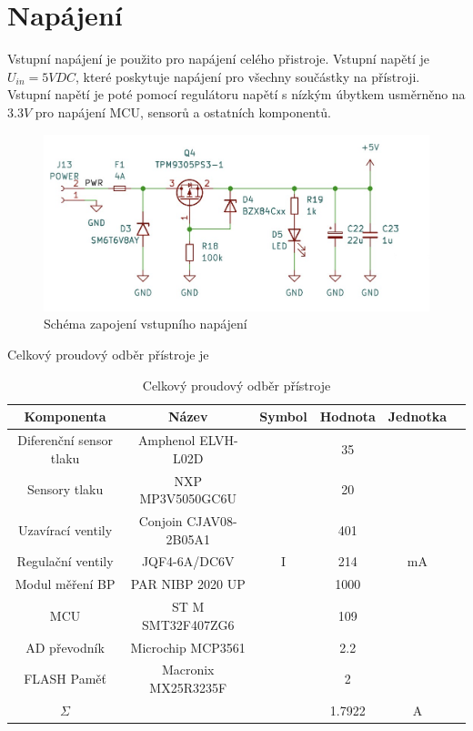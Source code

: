 \section{Napájení}
Vstupní napájení je použito pro napájení celého přistroje. Vstupní napětí je $U_{in} = 5V DC$, které poskytuje napájení pro všechny součástky na přístroji. Vstupní napětí je poté pomocí regulátoru napětí s nízkým úbytkem usměrněno na $3.3 V$ pro napájení MCU, sensorů a ostatních komponentů.

\begin{figure}[H]
    \includegraphics[width=0.9\linewidth]{pictures/power.jpg}
    \caption{Schéma zapojení vstupního napájení}
    \label{fig:power_input}
\end{figure}

Celkový proudový odběr přístroje je
\begin{table}[H]
    \label{tab:sum_of_current}
    \caption{Celkový proudový odběr přístroje}
    \hspace*{-1.2cm}
    \begin{ctucolortab}
        \begin{tabular}{cccccc}
            \toprule
            Komponenta              & Název                 & Symbol & Hodnota & Jednotka \\ \midrule
            Diferenční sensor tlaku & Amphenol ELVH-L02D    &        & 35      &          \\
            Sensory tlaku           & NXP MP3V5050GC6U      &        & 20      &          \\
            Uzavírací ventily       & Conjoin CJAV08-2B05A1 &        & 401     &          \\
            Regulační ventily       & JQF4-6A/DC6V          & I      & 214     & mA       \\
            Modul měření BP         & PAR NIBP 2020 UP      &        & 1000    &          \\
            MCU                     & ST M SMT32F407ZG6     &        & 109     &          \\
            AD převodník            & Microchip MCP3561     &        & 2.2     &          \\
            FLASH Paměť             & Macronix MX25R3235F   &        & 2       &          \\
            \bottomrule
            $\Sigma$                &                       &        & 1.7922  & A        \\
            \bottomrule
        \end{tabular}
    \end{ctucolortab}
\end{table}

